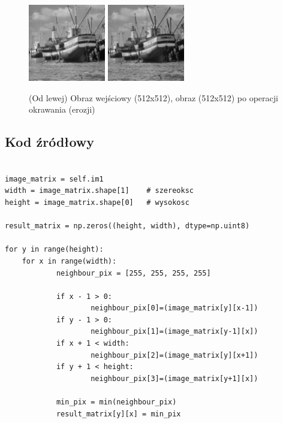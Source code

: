 \documentclass[final,a4paper,openany,12pt]{mwbk}
\begin{document}
\begin{figure}[H]
	\begin{center}
		\includegraphics[width=0.3\textwidth]{2/2Gray_E_Original}
		\includegraphics[width=0.3\textwidth]{2/2Gray_E_Result}
	\end{center}
	\caption{(Od lewej) Obraz wejściowy (512x512), obraz (512x512) po operacji okrawania (erozji) }
\end{figure}


\subsection*{Kod źródłowy}

\begin{lstlisting}[caption= Operacja okrawania (erozji) na obrazie szarym]

image_matrix = self.im1
width = image_matrix.shape[1]    # szereoksc
height = image_matrix.shape[0]   # wysokosc

result_matrix = np.zeros((height, width), dtype=np.uint8)

for y in range(height):
    for x in range(width):  
            neighbour_pix = [255, 255, 255, 255]

            if x - 1 > 0:
                    neighbour_pix[0]=(image_matrix[y][x-1])
            if y - 1 > 0:
                    neighbour_pix[1]=(image_matrix[y-1][x])
            if x + 1 < width:
                    neighbour_pix[2]=(image_matrix[y][x+1])
            if y + 1 < height:
                    neighbour_pix[3]=(image_matrix[y+1][x])

            min_pix = min(neighbour_pix)
            result_matrix[y][x] = min_pix

\end{lstlisting}
\end{document}
